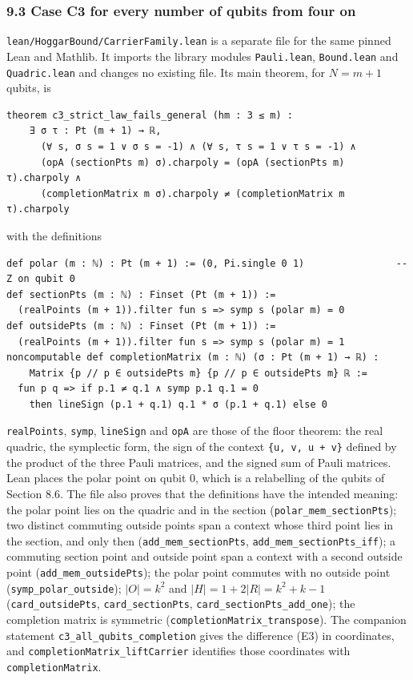 \documentclass[11pt,a4paper]{article}
\begin{document}
\subsubsection{9.3 Case C3 for every number of qubits from four on}\label{93-case-c3-for-every-number-of-qubits-from-four-on}

\nolinkurl{lean/HoggarBound/CarrierFamily.lean} is a separate file for the same pinned Lean and Mathlib. It
imports the library modules \texttt{Pauli.lean}, \texttt{Bound.lean} and \texttt{Quadric.lean} and changes no existing
file. Its main theorem, for \(N=m+1\) qubits, is

\begin{verbatim}
theorem c3_strict_law_fails_general (hm : 3 ≤ m) :
    ∃ σ τ : Pt (m + 1) → ℝ,
      (∀ s, σ s = 1 ∨ σ s = -1) ∧ (∀ s, τ s = 1 ∨ τ s = -1) ∧
      (opA (sectionPts m) σ).charpoly = (opA (sectionPts m) τ).charpoly ∧
      (completionMatrix m σ).charpoly ≠ (completionMatrix m τ).charpoly
\end{verbatim}

with the definitions

\begin{verbatim}
def polar (m : ℕ) : Pt (m + 1) := (0, Pi.single 0 1)                -- Z on qubit 0
def sectionPts (m : ℕ) : Finset (Pt (m + 1)) :=
  (realPoints (m + 1)).filter fun s => symp s (polar m) = 0
def outsidePts (m : ℕ) : Finset (Pt (m + 1)) :=
  (realPoints (m + 1)).filter fun s => symp s (polar m) = 1
noncomputable def completionMatrix (m : ℕ) (σ : Pt (m + 1) → ℝ) :
    Matrix {p // p ∈ outsidePts m} {p // p ∈ outsidePts m} ℝ :=
  fun p q => if p.1 ≠ q.1 ∧ symp p.1 q.1 = 0
    then lineSign (p.1 + q.1) q.1 * σ (p.1 + q.1) else 0
\end{verbatim}

\texttt{realPoints}, \texttt{symp}, \texttt{lineSign} and \texttt{opA} are those of the floor theorem: the real quadric, the
symplectic form, the sign of the context \texttt{\{u,\ v,\ u\ +\ v\}} defined by the product of the three Pauli
matrices, and the signed sum of Pauli matrices. Lean places the polar point on qubit 0, which is a
relabelling of the qubits of Section 8.6. The file also proves that the definitions have the intended
meaning: the polar point lies on the quadric and in the section (\nolinkurl{polar_mem_sectionPts}); two distinct
commuting outside points span a context whose third point lies in the section, and only then
(\nolinkurl{add_mem_sectionPts}, \nolinkurl{add_mem_sectionPts_iff}); a commuting section point and outside point span a
context with a second outside point (\nolinkurl{add_mem_outsidePts}); the polar point commutes with no outside
point (\nolinkurl{symp_polar_outside}); \(|O|=k^2\) and \(|H|=1+2|R|=k^2+k-1\) (\texttt{card\_outsidePts}, \texttt{card\_sectionPts},
\nolinkurl{card_sectionPts_add_one}); the
completion matrix is symmetric (\nolinkurl{completionMatrix_transpose}). The companion statement
\nolinkurl{c3_all_qubits_completion} gives the difference (E3) in coordinates, and
\nolinkurl{completionMatrix_liftCarrier} identifies those coordinates with \texttt{completionMatrix}.
\end{document}
